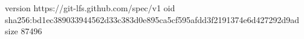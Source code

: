version https://git-lfs.github.com/spec/v1
oid sha256:bd1ec389033944562d33c383d0e895ca5cf595afdd3f2191374e6d427292d9ad
size 87496
